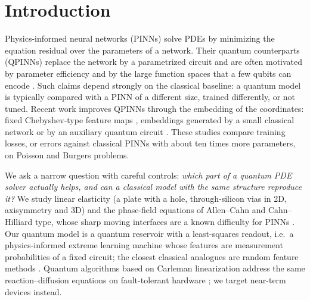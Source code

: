 \documentclass[11pt]{article}
\theoremstyle{remark}\newtheorem*{remark}{Remark}
\begin{document}
\section{Introduction}
Physics-informed neural networks (PINNs) \citep{raissi2019pinn} solve PDEs by minimizing the equation residual over
the parameters of a network. Their quantum counterparts (QPINNs) replace the network by a parametrized circuit
\citep{qcpinn2025,hybridqpinn2026} and are often motivated by parameter efficiency and by the large function spaces
that a few qubits can encode \citep{schuld2021encoding}. Such claims depend strongly on the classical baseline:
a quantum model is typically compared with a PINN of a different size, trained differently, or not tuned.
Recent work improves QPINNs through the embedding of the coordinates: fixed Chebyshev-type feature maps
\citep{kyriienko2021dqc}, embeddings generated by a small classical network \citep{berger2025teqpinn} or by an auxiliary
quantum circuit \citep{tran2026embedding}. These studies compare training losses, or errors against classical PINNs
with about ten times more parameters, on Poisson and Burgers problems.

We ask a narrow question with careful controls: \emph{which part of a quantum PDE solver actually helps, and can a
classical model with the same structure reproduce it?} We study linear elasticity (a plate with a hole, through-silicon
vias in 2D, axisymmetry and 3D) and the phase-field equations of Allen--Cahn and Cahn--Hilliard type, whose sharp
moving interfaces are a known difficulty for PINNs \citep{wight2021adaptive,mattey2022bcpinn}.
Our quantum model is a quantum reservoir \citep{ikeda2026qerc} with a least-squares readout, i.e.\ a physics-informed
extreme learning machine \citep{dwivedi2020pielm} whose features are measurement probabilities of a fixed circuit; the
closest classical analogues are random feature methods \citep{rahimi2007rf,chen2022rfm,zhou2026drfm,qrfm2025}.
Quantum algorithms based on Carleman linearization address the same reaction--diffusion equations on fault-tolerant
hardware \citep{an2023reactiondiffusion,sasaki2026cls}; we target near-term devices instead.
\end{document}
